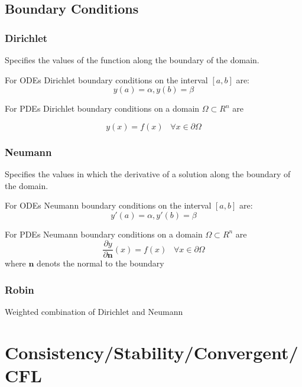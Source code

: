 \documentclass[doc]{apa}
\begin{document}
\subsection{Boundary Conditions}

\subsubsection{Dirichlet}
Specifies the values of the function along the boundary of the domain.

For ODEs Dirichlet boundary conditions on the interval $[a,b]$ are:
\begin{equation}
y(a) = \alpha, y(b) = \beta
\label{dr:bc}
\end{equation}

For PDEs  Dirichlet boundary conditions on a domain $ \Omega \subset R^n$ are

\begin{equation}
y(x) = f(x) \;\;\; \forall x \in \partial \Omega
\label{dr:bc1}
\end{equation}

\subsubsection{Neumann}
Specifies the values in which the derivative of a solution along the boundary of the domain.

For ODEs Neumann boundary conditions on the interval $[a,b]$ are:
\begin{equation}
y'(a) = \alpha, y'(b) = \beta
\label{neu:bc}
\end{equation}

For PDEs  Neumann boundary conditions on a domain $ \Omega \subset R^n$ are
\begin{equation}
\frac{\partial y}{\partial \mathbf{n}}(x) = f(x) \;\;\; \forall x \in \partial \Omega
\label{newu:bc1}
\end{equation}
where $\mathbf{n}$ denots the normal to the boundary 

\subsubsection{Robin}
Weighted combination of Dirichlet and Neumann


\section{Consistency/Stability/Convergent/CFL}
\end{document}
